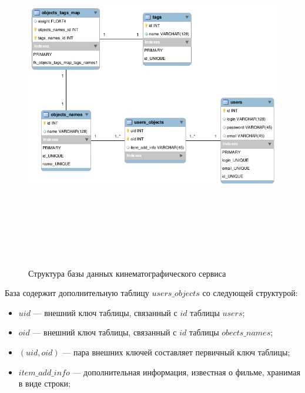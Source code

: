 \begin{figure}
\caption{Структура базы данных кинематографического сервиса}
\label{pic:db-ml}
\begin{center}
  \includegraphics[width=7in,height=6in]{pics/db-scheme-ml.png}
\end{center}
\end{figure}

База содержит дополнительную таблицу $users\_objects$ со следующей структурой:
\begin{itemize}
\item $uid$ --- внешний ключ таблицы, связанный с $id$ таблицы $users$;
\item $oid$ --- внешний ключ таблицы, связанный с $id$ таблицы $obects\_names$;
\item $(uid, oid)$ --- пара внешних ключей составляет первичный ключ таблицы;
\item $item\_add\_info$ --- дополнительная информация, известная о фильме, хранимая в виде строки;
\end{itemize}

